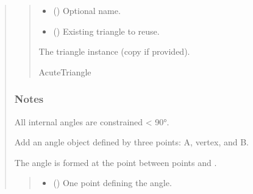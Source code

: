 \documentclass[letterpaper,10pt,english]{sphinxmanual}
\begin{document}
\begin{quote}
\begin{fulllineitems}
\begin{fulllineitems}
\begin{quote}
\begin{description}
\begin{itemize}
\item {} 
\sphinxAtStartPar
{} (\sphinxstyleliteralemphasis{\sphinxupquote{ | }}) \textendash{} Optional name.

\item {} 
\sphinxAtStartPar
{} (\sphinxstyleliteralemphasis{\sphinxupquote{ | }}) \textendash{} Existing triangle to reuse.

\end{itemize}

\sphinxAtStartPar
The triangle instance (copy if provided).

\sphinxAtStartPar
AcuteTriangle

\end{description}\end{quote}
\subsubsection*{Notes}

\sphinxAtStartPar
All internal angles are constrained \textless{} 90°.

\end{fulllineitems}


\begin{fulllineitems}
\label{\detokenize{pygeox:pygeox.add_objects.AddNamespace.angle}}
\pysigstartsignatures
\pysiglinewithargsret
{}
{\sphinxparamcomma {}\sphinxparamcomma {}\sphinxparamcomma {}\sphinxparamcomma {}\sphinxparamcomma {}}
{}
\pysigstopsignatures
\sphinxAtStartPar
Add an angle object defined by three points: A, vertex, and B.

\sphinxAtStartPar
The angle is formed at the  point between points  and .
\begin{quote}\begin{description}
\begin{itemize}
\item {} 
\sphinxAtStartPar
{} () \textendash{} One point defining the angle.


\end{itemize}
\end{description}
\end{quote}
\end{fulllineitems}
\end{fulllineitems}
\end{quote}
\end{document}
